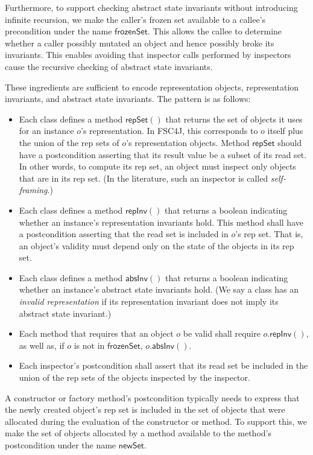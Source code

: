 \documentclass{article}
\begin{document}
Furthermore, to support checking abstract state invariants without introducing infinite recursion, we make the caller's frozen set available to a callee's precondition under the name $\mathsf{frozenSet}$. This allows the callee to determine whether a caller possibly mutated an object and hence possibly broke its invariants. This enables avoiding that inspector calls performed by inspectors cause the recursive checking of abstract state invariants.

These ingredients are sufficient to encode representation objects, representation invariants, and abstract state invariants. The pattern is as follows:
\begin{itemize}
\item Each class defines a method $\mathsf{repSet}()$ that returns the set of objects it uses for an instance $o$'s representation. In FSC4J, this corresponds to $o$ itself plus the union of the rep sets of $o$'s representation objects. Method $\mathsf{repSet}$ should have a postcondition asserting that its result value be a subset of its read set. In other words, to compute its rep set, an object must inspect only objects that are in its rep set. (In the literature, such an inspector is called \emph{self-framing}.)
\item Each class defines a method $\mathsf{repInv}()$ that returns a boolean indicating whether an instance's representation invariants hold. This method shall have a postcondition asserting that the read set is included in $o$'s rep set. That is, an object's validity must depend only on the state of the objects in its rep set.
\item Each class defines a method $\mathsf{absInv}()$ that returns a boolean indicating whether an instance's abstract state invariants hold. (We say a class has an \emph{invalid representation} if its representation invariant does not imply its abstract state invariant.)
\item Each method that requires that an object $o$ be valid shall require $o.\mathsf{repInv}()$, as well as, if $o$ is not in $\mathsf{frozenSet}$, $o.\mathsf{absInv}()$.
\item Each inspector's postcondition shall assert that its read set be included in the union of the rep sets of the objects inspected by the inspector.
\end{itemize}

A constructor or factory method's postcondition typically needs to express that the newly created object's rep set is included in the set of objects that were allocated during the evaluation of the constructor or method. To support this, we make the set of objects allocated by a method available to the method's postcondition under the name $\mathsf{newSet}$.
\end{document}
